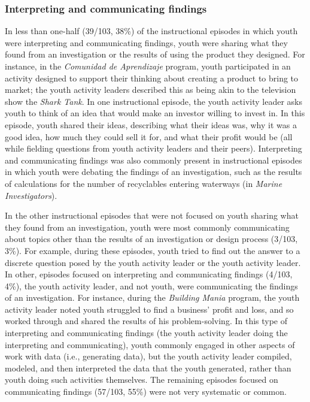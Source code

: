 \documentclass[]{msu-thesis}
\theoremstyle{definition}
\theoremstyle{definition}
\theoremstyle{definition}
\theoremstyle{remark}
\begin{document}
\subsubsection{Interpreting and communicating
findings}\label{interpreting-and-communicating-findings}

In less than one-half (39/103, 38\%) of the instructional episodes in
which youth were interpreting and communicating findings, youth were
sharing what they found from an investigation or the results of using
the product they designed. For instance, in the \emph{Comunidad de
Aprendizaje} program, youth participated in an activity designed to
support their thinking about creating a product to bring to market; the
youth activity leaders described this as being akin to the television
show the \emph{Shark Tank}. In one instructional episode, the youth
activity leader asks youth to think of an idea that would make an
investor willing to invest in. In this episode, youth shared their
ideas, describing what their ideas was, why it was a good idea, how much
they could sell it for, and what their profit would be (all while
fielding questions from youth activity leaders and their peers).
Interpreting and communicating findings was also commonly present in
instructional episodes in which youth were debating the findings of an
investigation, such as the results of calculations for the number of
recyclables entering waterways (in \emph{Marine Investigators}).

In the other instructional episodes that were not focused on youth
sharing what they found from an investigation, youth were most commonly
communicating about topics other than the results of an investigation or
design process (3/103, 3\%). For example, during these episodes, youth
tried to find out the answer to a discrete question posed by the youth
activity leader or the youth activity leader. In other, episodes focused
on interpreting and communicating findings (4/103, 4\%), the youth
activity leader, and not youth, were communicating the findings of an
investigation. For instance, during the \emph{Building Mania} program,
the youth activity leader noted youth struggled to find a business'
profit and loss, and so worked through and shared the results of his
problem-solving. In this type of interpreting and communicating findings
(the youth activity leader doing the interpreting and communicating),
youth commonly engaged in other aspects of work with data (i.e.,
generating data), but the youth activity leader compiled, modeled, and
then interpreted the data that the youth generated, rather than youth
doing such activities themselves. The remaining episodes focused on
communicating findings (57/103, 55\%) were not very systematic or
common.
\end{document}
